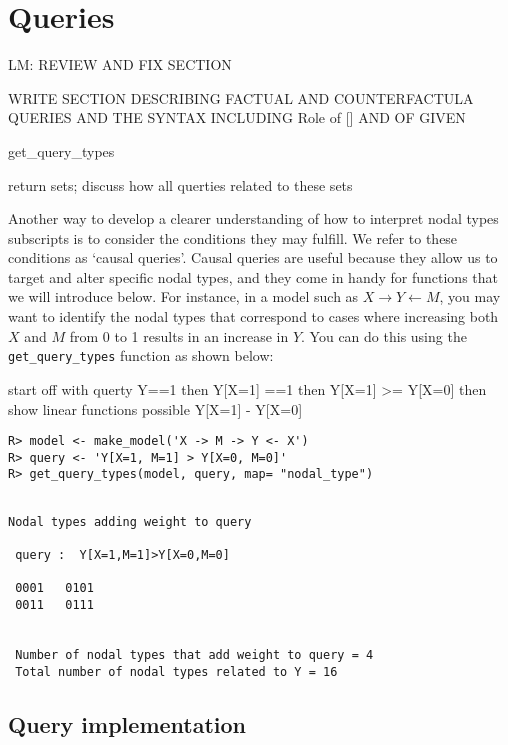 \documentclass[
  11pt,
  article]{jss}
\begin{document}
\hypertarget{queries}{%
\section{Queries}\label{queries}}

LM: REVIEW AND FIX SECTION

WRITE SECTION DESCRIBING FACTUAL AND COUNTERFACTULA QUERIES AND THE
SYNTAX INCLUDING Role of {[}{]} AND OF GIVEN

get\_query\_types

return sets; discuss how all querties related to these sets

Another way to develop a clearer understanding of how to interpret nodal
types subscripts is to consider the conditions they may fulfill. We
refer to these conditions as `causal queries'. Causal queries are useful
because they allow us to target and alter specific nodal types, and they
come in handy for functions that we will introduce below. For instance,
in a model such as \(X \rightarrow Y \leftarrow M\), you may want to
identify the nodal types that correspond to cases where increasing both
\(X\) and \(M\) from 0 to 1 results in an increase in \(Y\). You can do
this using the \texttt{get\_query\_types} function as shown below:

start off with querty Y==1 then Y{[}X=1{]} ==1 then Y{[}X=1{]}
\textgreater= Y{[}X=0{]} then show linear functions possible Y{[}X=1{]}
- Y{[}X=0{]}

\begin{verbatim}
R> model <- make_model('X -> M -> Y <- X')
R> query <- 'Y[X=1, M=1] > Y[X=0, M=0]'
R> get_query_types(model, query, map= "nodal_type")
\end{verbatim}

\begin{verbatim}

Nodal types adding weight to query

 query :  Y[X=1,M=1]>Y[X=0,M=0] 

 0001   0101
 0011   0111


 Number of nodal types that add weight to query = 4
 Total number of nodal types related to Y = 16
\end{verbatim}

\hypertarget{query-implementation}{%
\subsection{Query implementation}\label{query-implementation}}
\end{document}
